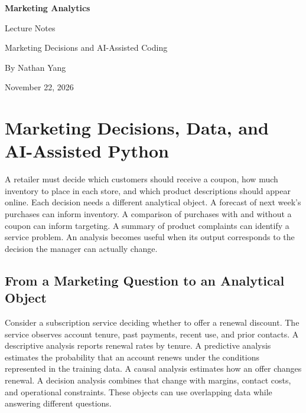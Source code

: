 

\hypersetup{pageanchor=false}
\begin{titlepage}
\color{IlliniBlue}
\vspace*{1.2cm}
{\Huge\bfseries Marketing Analytics\par}
\vspace{.8cm}
{\LARGE Lecture Notes\par}
\vspace{.5cm}
{\large Marketing Decisions and AI-Assisted Coding\par}
\vspace{1.1cm}
\noindent{\color{IlliniOrange}\rule{\textwidth}{2pt}}\par
\vspace{.7cm}
{\large By Nathan Yang\par}
{\large November 22, 2026\par}
\end{titlepage}
\hypersetup{pageanchor=true}
\tableofcontents
\clearpage
{}
\hypertarget{M01-m1.-marketing-decisions-data-and-ai-assisted-python}{%
\chapter{Marketing Decisions, Data, and AI-Assisted
Python}\label{M01-m1.-marketing-decisions-data-and-ai-assisted-python}}

\noindent A retailer must decide which customers should receive a coupon, how much
inventory to place in each store, and which product descriptions should
appear online. Each decision needs a different analytical object. A
forecast of next week's purchases can inform inventory. A comparison of
purchases with and without a coupon can inform targeting. A summary of
product complaints can identify a service problem. An analysis becomes
useful when its output corresponds to the decision the manager can
actually change.

\hypertarget{M01-from-a-marketing-question-to-an-analytical-object}{%
\section{From a Marketing Question to an Analytical
Object}\label{M01-from-a-marketing-question-to-an-analytical-object}}

\noindent Consider a subscription service deciding whether to offer a renewal
discount. The service observes account tenure, past payments, recent
use, and prior contacts. A descriptive analysis reports renewal rates by
tenure. A predictive analysis estimates the probability that an account
renews under the conditions represented in the training data. A causal
analysis estimates how an offer changes renewal. A decision analysis
combines that change with margins, contact costs, and operational
constraints. These objects can use overlapping data while answering
different questions.

